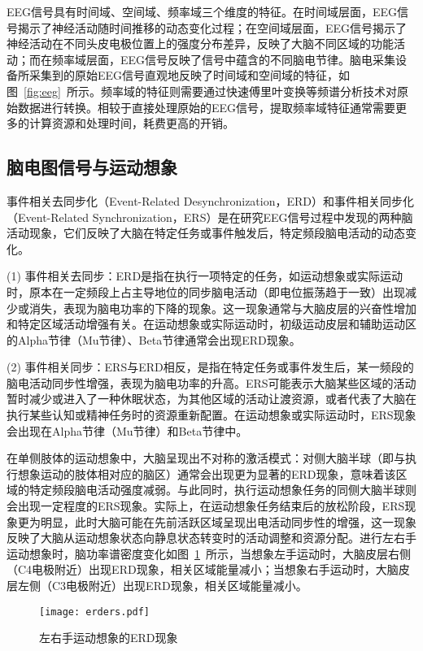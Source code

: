 EEG信号具有时间域、空间域、频率域三个维度的特征。在时间域层面，EEG信号揭示了神经活动随时间推移的动态变化过程；在空间域层面，EEG信号揭示了神经活动在不同头皮电极位置上的强度分布差异，反映了大脑不同区域的功能活动；而在频率域层面，EEG信号反映了信号中蕴含的不同脑电节律。脑电采集设备所采集到的原始EEG信号直观地反映了时间域和空间域的特征，如图~\ref{fig:eeg}~所示。频率域的特征则需要通过快速傅里叶变换等频谱分析技术对原始数据进行转换。相较于直接处理原始的EEG信号，提取频率域特征通常需要更多的计算资源和处理时间，耗费更高的开销。

\subsection{脑电图信号与运动想象}

事件相关去同步化（Event-Related Desynchronization，ERD）和事件相关同步化（Event-Related Synchronization，ERS）是在研究EEG信号过程中发现的两种脑活动现象，它们反映了大脑在特定任务或事件触发后，特定频段脑电活动的动态变化。

(1) 事件相关去同步：ERD是指在执行一项特定的任务，如运动想象或实际运动时，原本在一定频段上占主导地位的同步脑电活动（即电位振荡趋于一致）出现减少或消失，表现为脑电功率的下降的现象。这一现象通常与大脑皮层的兴奋性增加和特定区域活动增强有关。在运动想象或实际运动时，初级运动皮层和辅助运动区的Alpha节律（Mu节律）、Beta节律通常会出现ERD现象。

(2) 事件相关同步：ERS与ERD相反，是指在特定任务或事件发生后，某一频段的脑电活动同步性增强，表现为脑电功率的升高。ERS可能表示大脑某些区域的活动暂时减少或进入了一种休眠状态，为其他区域的活动让渡资源，或者代表了大脑在执行某些认知或精神任务时的资源重新配置。在运动想象或实际运动时，ERS现象会出现在Alpha节律（Mu节律）和Beta节律中。

在单侧肢体的运动想象中，大脑呈现出不对称的激活模式：对侧大脑半球（即与执行想象运动的肢体相对应的脑区）通常会出现更为显著的ERD现象，意味着该区域的特定频段脑电活动强度减弱\cite{pfurtscheller1977event}。与此同时，执行运动想象任务的同侧大脑半球则会出现一定程度的ERS现象。实际上，在运动想象任务结束后的放松阶段，ERS现象更为明显，此时大脑可能在先前活跃区域呈现出电活动同步性的增强，这一现象反映了大脑从运动想象状态向静息状态转变时的活动调整和资源分配。进行左右手运动想象时，脑功率谱密度变化如图~\ref{fig:erders}~所示，当想象左手运动时，大脑皮层右侧（C4电极附近）出现ERD现象，相关区域能量减小；当想象右手运动时，大脑皮层左侧（C3电极附近）出现ERD现象，相关区域能量减小\cite{blankertz2010neurophysiological}。
\begin{figure}[ht]
    \centering
    \texttt{[image: erders.pdf]}
    \caption{左右手运动想象的ERD现象\cite{blankertz2010neurophysiological}}
    \label{fig:erders}
\end{figure}

